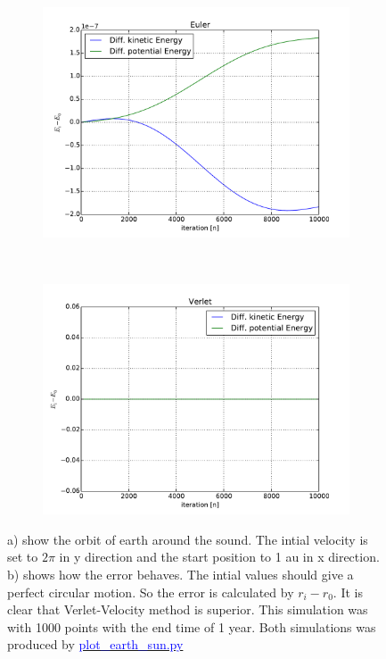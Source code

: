 \begin{figure}[H]
    \centering
    \begin{subfigure}{0.5\textwidth}
        \centering
        \includegraphics[width=\linewidth]{result/bilder/kin-pot-euler.pdf}
    	\caption{}
    \end{subfigure}%
    ~ 
    \begin{subfigure}{0.5\textwidth}
        \centering
        \includegraphics[width=\linewidth]{result/bilder/kin-pot-verlet.pdf}
        \caption{}
    \end{subfigure}
    \caption{a) show the orbit of earth around the sound. The intial velocity is set to $2\pi$ in y direction and the start position to 1 au in x direction. b) shows how the error behaves. The intial values should give a perfect circular motion. So the error is calculated by $r_i - r_{0}$. It is clear that Verlet-Velocity method is superior. This simulation was with 1000 points with the end time of 1 year. Both simulations was produced by \href{https://github.com/erikfsk/Project-3/blob/master/Project3/3a/plot_earth_sun.py}{\textcolor{blue}{plot\_earth\_sun.py}}}
    \label{fig:conserved-energy}
\end{figure}

